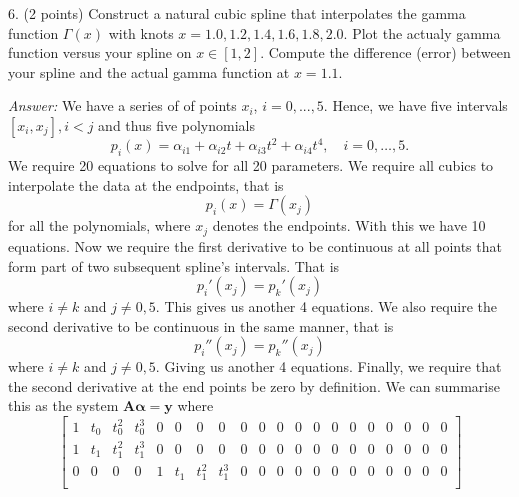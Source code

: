\documentclass{article}
\newenvironment{answer}{\textit{Answer:}}{}
\begin{document}
6. (2 points) Construct a natural cubic spline that interpolates the gamma
function $\Gamma(x)$ with knots $x = 1.0, 1.2, 1.4, 1.6, 1.8, 2.0$.
Plot the actualy gamma function versus your spline on $x \in [1,2]$.
Compute the difference (error) between your spline and the actual gamma
function at $x = 1.1$.

\begin{answer}
    We have a series of of points $x_i$, $i = 0,...,5$. Hence, we have five
    intervals $[x_i, x_j], i < j$ and thus five polynomials
    \begin{equation*}
        p_i(x) = \alpha_{i1} + \alpha_{i2} t + \alpha_{i3} t^2 + \alpha_{i4}t^4,
        \quad i = 0,\dots,5.
    \end{equation*}
    We require 20 equations to solve for all 20 parameters. We require all
    cubics to interpolate the data at the endpoints, that is
    \begin{equation*}
        p_i(x) = \Gamma(x_j)
    \end{equation*}
    for all the polynomials, where $x_j$ denotes the endpoints.
    With this we have 10 equations. Now we require the first
    derivative to be continuous at all points that form part of
    two subsequent spline's intervals. That is
    \begin{equation*}
        p_i'(x_j) = p_k'(x_j)
    \end{equation*}
    where $i \neq k$ and $j \neq 0,5$. This gives us another 4 equations.
    We also require the second derivative to be continuous in the same
    manner, that is
    \begin{equation*}
        p_i''(x_j) = p_k''(x_j)
    \end{equation*}
    where $i \neq k$ and $j \neq 0,5$. Giving us another 4 equations.
    Finally, we require that the second derivative at the end points be zero
    by definition.
    We can summarise this as the system $\bm{A}\bm{\alpha} = \bm{y}$ where
    \begin{equation*}
        \begin{bmatrix}
            1 & t_0 & t_0^2 & t_0^3  & 0 & 0   & 0     & 0       & 0 & 0   & 0     & 0       & 0 & 0   & 0     & 0       & 0 & 0   & 0     & 0       \\
            1 & t_1 & t_1^2 & t_1^3  & 0 & 0   & 0     & 0       & 0 & 0   & 0     & 0       & 0 & 0   & 0     & 0       & 0 & 0   & 0     & 0       \\
            0 & 0   & 0     & 0      & 1 & t_1 & t_1^2 & t_1^3   & 0 & 0   & 0     & 0       & 0 & 0   & 0     & 0       & 0 & 0   & 0     & 0       \\

\end{bmatrix}
\end{equation*}
\end{answer}
\end{document}
